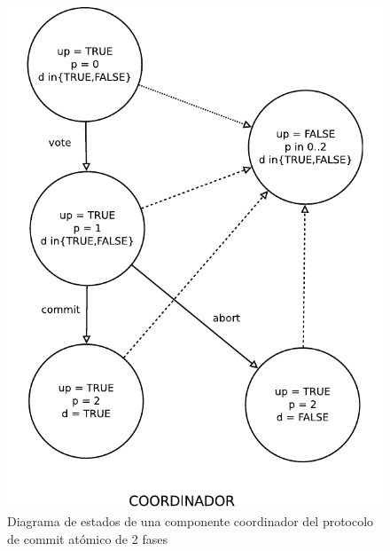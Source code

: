 \documentclass[titlepage, 12pt]{book}
\begin{document}
\begin{figure}[H]
  \centering
    \includegraphics[scale=0.75]{Imagenes/2pcCoor.pdf}
  \caption{Diagrama de estados de una componente coordinador del protocolo de commit at\'omico de 2 fases}
  \label{2pcc}
\end{figure}
~\\
\end{document}

